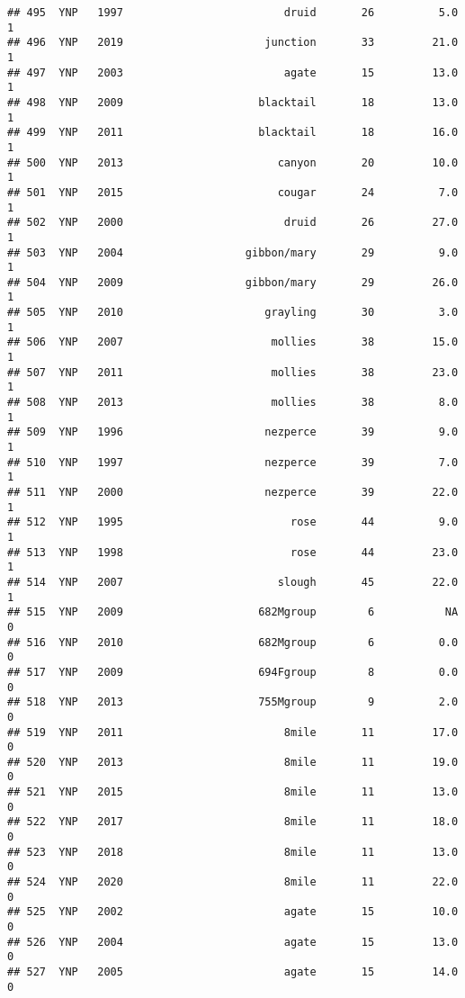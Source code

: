 \documentclass[
]{article}
\begin{document}
\begin{verbatim}
## 495  YNP   1997                         druid       26          5.0       1
## 496  YNP   2019                      junction       33         21.0       1
## 497  YNP   2003                         agate       15         13.0       1
## 498  YNP   2009                     blacktail       18         13.0       1
## 499  YNP   2011                     blacktail       18         16.0       1
## 500  YNP   2013                        canyon       20         10.0       1
## 501  YNP   2015                        cougar       24          7.0       1
## 502  YNP   2000                         druid       26         27.0       1
## 503  YNP   2004                   gibbon/mary       29          9.0       1
## 504  YNP   2009                   gibbon/mary       29         26.0       1
## 505  YNP   2010                      grayling       30          3.0       1
## 506  YNP   2007                       mollies       38         15.0       1
## 507  YNP   2011                       mollies       38         23.0       1
## 508  YNP   2013                       mollies       38          8.0       1
## 509  YNP   1996                      nezperce       39          9.0       1
## 510  YNP   1997                      nezperce       39          7.0       1
## 511  YNP   2000                      nezperce       39         22.0       1
## 512  YNP   1995                          rose       44          9.0       1
## 513  YNP   1998                          rose       44         23.0       1
## 514  YNP   2007                        slough       45         22.0       1
## 515  YNP   2009                     682Mgroup        6           NA       0
## 516  YNP   2010                     682Mgroup        6          0.0       0
## 517  YNP   2009                     694Fgroup        8          0.0       0
## 518  YNP   2013                     755Mgroup        9          2.0       0
## 519  YNP   2011                         8mile       11         17.0       0
## 520  YNP   2013                         8mile       11         19.0       0
## 521  YNP   2015                         8mile       11         13.0       0
## 522  YNP   2017                         8mile       11         18.0       0
## 523  YNP   2018                         8mile       11         13.0       0
## 524  YNP   2020                         8mile       11         22.0       0
## 525  YNP   2002                         agate       15         10.0       0
## 526  YNP   2004                         agate       15         13.0       0
## 527  YNP   2005                         agate       15         14.0       0

\end{verbatim}
\end{document}
